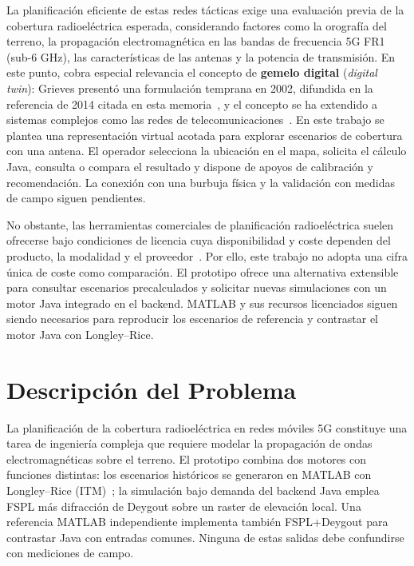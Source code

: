 La planificación eficiente de estas redes tácticas exige una evaluación previa de la cobertura radioeléctrica esperada, considerando factores como la orografía del terreno, la propagación electromagnética en las bandas de frecuencia 5G FR1 (sub-6 GHz), las características de las antenas y la potencia de transmisión. En este punto, cobra especial relevancia el concepto de \textbf{gemelo digital} (\textit{digital twin}): Grieves presentó una formulación temprana en 2002, difundida en la referencia de 2014 citada en esta memoria~\cite{grieves2014digital}, y el concepto se ha extendido a sistemas complejos como las redes de telecomunicaciones~\cite{fuller2020digital}. En este trabajo se plantea una representación virtual acotada para explorar escenarios de cobertura con una antena. El operador selecciona la ubicación en el mapa, solicita el cálculo Java, consulta o compara el resultado y dispone de apoyos de calibración y recomendación. La conexión con una burbuja física y la validación con medidas de campo siguen pendientes.

No obstante, las herramientas comerciales de planificación radioeléctrica suelen ofrecerse bajo condiciones de licencia cuya disponibilidad y coste dependen del producto, la modalidad y el proveedor~\cite{xirio2024,atoll}. Por ello, este trabajo no adopta una cifra única de coste como comparación. El prototipo ofrece una alternativa extensible para consultar escenarios precalculados y solicitar nuevas simulaciones con un motor Java integrado en el backend. MATLAB y sus recursos licenciados siguen siendo necesarios para reproducir los escenarios de referencia y contrastar el motor Java con Longley--Rice.

\section{Descripción del Problema}
\label{sec:problema}

La planificación de la cobertura radioeléctrica en redes móviles 5G constituye una tarea de ingeniería compleja que requiere modelar la propagación de ondas electromagnéticas sobre el terreno. El prototipo combina dos motores con funciones distintas: los escenarios históricos se generaron en MATLAB con Longley--Rice (ITM)~\cite{longley1968transmission}; la simulación bajo demanda del backend Java emplea FSPL más difracción de Deygout sobre un raster de elevación local. Una referencia MATLAB independiente implementa también FSPL+Deygout para contrastar Java con entradas comunes. Ninguna de estas salidas debe confundirse con mediciones de campo.

